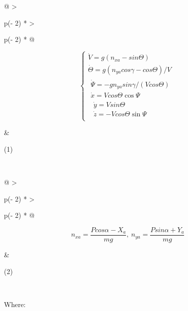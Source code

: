 \begin{longtable}[]{@{}
  >{\raggedright\arraybackslash}p{(\columnwidth - 2\tabcolsep) * }
  >{\raggedright\arraybackslash}p{(\columnwidth - 2\tabcolsep) * }@{}}
\toprule\noalign{}
\begin{minipage}[b]{\linewidth}\raggedright
\[\left\{ \begin{matrix}
\dot{V} = g(n_{xa} - sin\Theta) \\
\dot{\Theta} = g(n_{ya}cos\gamma - cos\Theta)/V \\
\begin{matrix}
\dot{\Psi} = - gn_{ya}sin\gamma/(Vcos\Theta) \\
\dot{x} = Vcos\Theta\cos\Psi \\
\begin{matrix}
\dot{y} = Vsin\Theta \\
\dot{z} = - Vcos\Theta\sin\Psi
\end{matrix}
\end{matrix}
\end{matrix} \right.\ \]
\end{minipage} & \begin{minipage}[b]{\linewidth}\raggedright
(1)
\end{minipage} \\
\midrule\noalign{}
\endhead
\bottomrule\noalign{}
\endlastfoot
\end{longtable}

\begin{longtable}[]{@{}
  >{\raggedright\arraybackslash}p{(\columnwidth - 2\tabcolsep) * }
  >{\raggedright\arraybackslash}p{(\columnwidth - 2\tabcolsep) * }@{}}
\toprule\noalign{}
\begin{minipage}[b]{\linewidth}\raggedright
\[n_{xa} = \frac{Pcos\alpha - X_{a}}{mg},\ n_{ya} = \frac{Psin\alpha + Y_{a}}{mg}\]
\end{minipage} & \begin{minipage}[b]{\linewidth}\raggedright
(2)
\end{minipage} \\
\midrule\noalign{}
\endhead
\bottomrule\noalign{}
\endlastfoot
\end{longtable}

Where:

